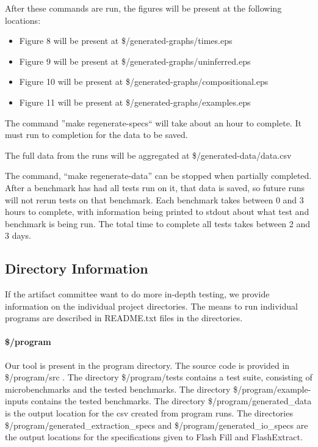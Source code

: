 \documentclass[sigplan,acmsmall]{acmart}
\begin{document}
After these commands are run, the figures will be present at the following
locations: 
\begin{itemize}
\item Figure 8 will be present at \$/generated-graphs/times.eps
\item Figure 9 will be present at \$/generated-graphs/uninferred.eps
\item Figure 10 will be present at \$/generated-graphs/compositional.eps
\item Figure 11 will be present at \$/generated-graphs/examples.eps
\end{itemize}

The command ''make regenerate-specs`` will take about an hour to complete.  It
must run to completion for the data to be saved.

The full data from the runs will be aggregated at
\$/generated-data/data.csv

The command, ``make regenerate-data'' can be stopped when partially completed.
After a benchmark has had all tests run on it, that data is saved, so future
runs will not rerun tests on that benchmark.  Each benchmark takes between 0 and
3 hours to complete, with information being printed to stdout about what
test and benchmark is being run.  The total time to complete all tests takes
between 2 and 3 days.

\subsection{Directory Information}

If the artifact committee want to do more in-depth testing, we provide
information on the individual project directories.  The means to run individual
programs are described in README.txt files in the directories.

\paragraph*{\$/program}  Our tool is present in the program directory.  The
source code is provided in \$/program/src .  The directory \$/program/tests
contains a test suite, consisting of microbenchmarks and the tested benchmarks.
The directory \$/program/example-inputs contains the tested benchmarks.
The directory \$/program/generated\_data is the output location for the csv created from
program runs.  The directories \$/program/generated\_extraction\_specs and
\$/program/generated\_io\_specs are the output locations for the specifications
given to Flash Fill and FlashExtract.
\end{document}
